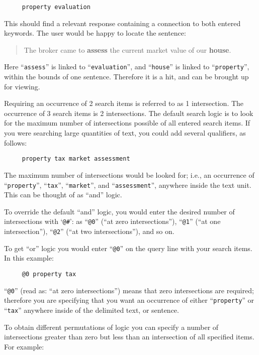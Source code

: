 \begin{verbatim}
     property evaluation
\end{verbatim}

This should find a relevant response containing a connection to both
entered keywords.  The user would be happy to locate the sentence:

\begin{quote}
      The broker came to {\bf assess} the current market value of our {\bf house}.
\end{quote}

Here ``\verb`assess`'' is linked to ``\verb`evaluation`'', and
``\verb`house`'' is linked to ``\verb`property`'', within the bounds
of one sentence.  Therefore it is a hit, and can be brought up for
viewing.

Requiring an occurrence of 2 search items is referred to as 1
intersection.  The occurrence of 3 search items is 2 intersections.
The default search logic is to look for the maximum number of
intersections possible of all entered search items.  If you were
searching large quantities of text, you could add several qualifiers,
as follows:

\begin{verbatim}
     property tax market assessment
\end{verbatim}

The maximum number of intersections would be looked for; i.e., an
occurrence of ``\verb`property`'', ``\verb`tax`'', ``\verb`market`'',
and ``\verb`assessment`'', anywhere inside the text unit.  This can be
thought of as ``and'' logic.

To override the default ``and'' logic, you would enter the desired
number of intersections with `\verb`@#`':  as ``\verb`@0`'' (``at zero
intersections''), ``\verb`@1`'' (``at one intersection''),
``\verb`@2`'' (``at two intersections''), and so on.

To get ``or'' logic you would enter ``\verb`@0`'' on the query line
with your search items.  In this example:

\begin{verbatim}
     @0 property tax
\end{verbatim}

``\verb`@0`'' (read as:  ``at zero intersections'') means that zero
intersections are required; therefore you are specifying that you want
an occurrence of either ``\verb`property`'' or ``\verb`tax`'' anywhere
inside of the delimited text, or sentence.

To obtain different permutations of logic you can specify a number of
intersections greater than zero but less than an intersection of all
specified items.  For example:

